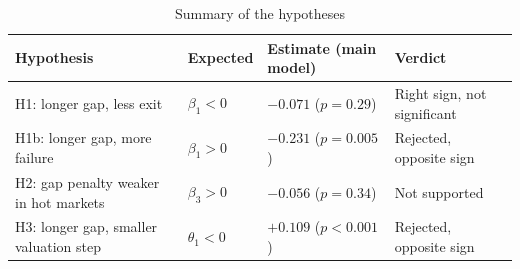 \begin{table}[tbp]
\centering\footnotesize
\caption{Summary of the hypotheses}
\label{tab:T13}
\begin{tabular}{llll}
\toprule
Hypothesis & Expected & Estimate (main model) & Verdict \\
\midrule
H1: longer gap, less exit & $\beta_1<0$ & $-0.071$ ($p=0.29$) & Right sign, not significant \\
H1b: longer gap, more failure & $\beta_1>0$ & $-0.231$ ($p=0.005$) & Rejected, opposite sign \\
H2: gap penalty weaker in hot markets & $\beta_3>0$ & $-0.056$ ($p=0.34$) & Not supported \\
H3: longer gap, smaller valuation step & $\theta_1<0$ & $+0.109$ ($p<0.001$) & Rejected, opposite sign \\
\bottomrule
\end{tabular}
\end{table}
